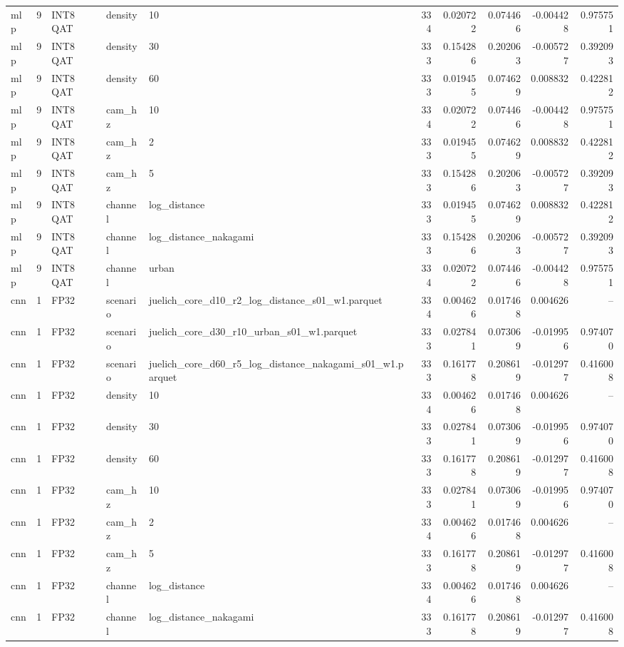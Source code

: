 \begin{tabular}{lrlllrrrrr}
mlp & 9 & INT8 QAT & density & 10 & 334 & 0.020722 & 0.074466 & -0.004428 & 0.975751 \\
mlp & 9 & INT8 QAT & density & 30 & 333 & 0.154286 & 0.202063 & -0.005727 & 0.392093 \\
mlp & 9 & INT8 QAT & density & 60 & 333 & 0.019455 & 0.074629 & 0.008832 & 0.422812 \\
mlp & 9 & INT8 QAT & cam\_hz & 10 & 334 & 0.020722 & 0.074466 & -0.004428 & 0.975751 \\
mlp & 9 & INT8 QAT & cam\_hz & 2 & 333 & 0.019455 & 0.074629 & 0.008832 & 0.422812 \\
mlp & 9 & INT8 QAT & cam\_hz & 5 & 333 & 0.154286 & 0.202063 & -0.005727 & 0.392093 \\
mlp & 9 & INT8 QAT & channel & log\_distance & 333 & 0.019455 & 0.074629 & 0.008832 & 0.422812 \\
mlp & 9 & INT8 QAT & channel & log\_distance\_nakagami & 333 & 0.154286 & 0.202063 & -0.005727 & 0.392093 \\
mlp & 9 & INT8 QAT & channel & urban & 334 & 0.020722 & 0.074466 & -0.004428 & 0.975751 \\
cnn & 1 & FP32 & scenario & juelich\_core\_d10\_r2\_log\_distance\_s01\_w1.parquet & 334 & 0.004626 & 0.017468 & 0.004626 & -- \\
cnn & 1 & FP32 & scenario & juelich\_core\_d30\_r10\_urban\_s01\_w1.parquet & 333 & 0.027841 & 0.073069 & -0.019956 & 0.974070 \\
cnn & 1 & FP32 & scenario & juelich\_core\_d60\_r5\_log\_distance\_nakagami\_s01\_w1.parquet & 333 & 0.161778 & 0.208619 & -0.012977 & 0.416008 \\
cnn & 1 & FP32 & density & 10 & 334 & 0.004626 & 0.017468 & 0.004626 & -- \\
cnn & 1 & FP32 & density & 30 & 333 & 0.027841 & 0.073069 & -0.019956 & 0.974070 \\
cnn & 1 & FP32 & density & 60 & 333 & 0.161778 & 0.208619 & -0.012977 & 0.416008 \\
cnn & 1 & FP32 & cam\_hz & 10 & 333 & 0.027841 & 0.073069 & -0.019956 & 0.974070 \\
cnn & 1 & FP32 & cam\_hz & 2 & 334 & 0.004626 & 0.017468 & 0.004626 & -- \\
cnn & 1 & FP32 & cam\_hz & 5 & 333 & 0.161778 & 0.208619 & -0.012977 & 0.416008 \\
cnn & 1 & FP32 & channel & log\_distance & 334 & 0.004626 & 0.017468 & 0.004626 & -- \\
cnn & 1 & FP32 & channel & log\_distance\_nakagami & 333 & 0.161778 & 0.208619 & -0.012977 & 0.416008 \\

\end{tabular}
